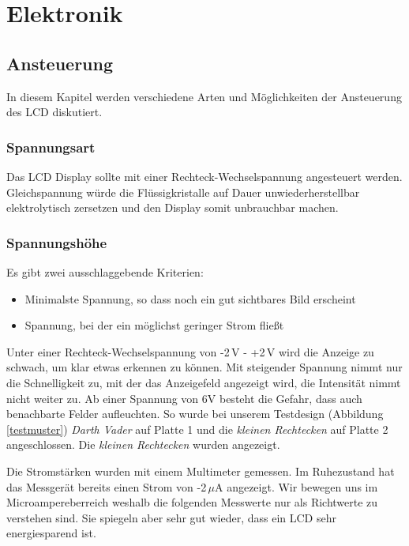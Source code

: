 \section{Elektronik}\label{sec:elektronik}
\subsection{Ansteuerung}
In diesem Kapitel werden verschiedene Arten und Möglichkeiten der Ansteuerung des LCD diskutiert.

\subsubsection{Spannungsart}
Das LCD Display sollte mit einer Rechteck-Wechselspannung angesteuert werden. Gleichspannung würde die Flüssigkristalle auf Dauer unwiederherstellbar elektrolytisch zersetzen und den Display somit unbrauchbar machen.

\subsubsection{Spannungshöhe}\label{subsec:spannung}
Es gibt zwei ausschlaggebende Kriterien:
\begin{itemize}
\item Minimalste Spannung, so dass noch ein gut sichtbares Bild erscheint
\item Spannung, bei der ein möglichst geringer Strom fließt\\
\end{itemize}

Unter einer Rechteck-Wechselspannung von -2\,V - +2\,V wird die Anzeige zu schwach, um klar etwas erkennen zu können. Mit steigender Spannung nimmt nur die Schnelligkeit zu, mit der das Anzeigefeld angezeigt wird, die Intensität nimmt nicht weiter zu. Ab einer Spannung von 6V besteht die Gefahr, dass auch benachbarte Felder aufleuchten. So wurde bei unserem Testdesign (Abbildung \ref{testmuster}) \textit{Darth Vader} auf Platte 1 und die \textit{kleinen Rechtecken} auf Platte 2 angeschlossen. Die \textit{kleinen Rechtecken} wurden angezeigt.

Die Stromstärken wurden mit einem Multimeter gemessen. Im Ruhezustand hat das Messgerät bereits einen Strom von -2\,$\mu$A 
 angezeigt. Wir bewegen uns im Microampereberreich weshalb die folgenden Messwerte nur als Richtwerte zu verstehen sind. Sie spiegeln aber sehr gut wieder, dass ein LCD sehr energiesparend ist.


